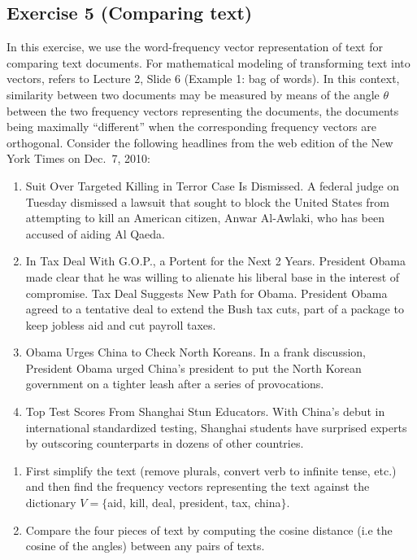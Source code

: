 \documentclass[11pt]{article}
\begin{document}
\newpage
\subsection*{Exercise 5 (Comparing text)}

In this exercise, we  use the word-fre\-quen\-cy vector representation of text
 for comparing  text documents. For mathematical modeling of transforming text into vectors, refers to Lecture 2, Slide 6 (Example 1: bag of words).
In this context, similarity between two documents may be measured by means of the angle $\theta$ between the two frequency vectors
representing the documents, the documents being maximally ``different'' when the corresponding frequency vectors are orthogonal.
Consider the following
headlines from the web edition of the New York Times on Dec.\ 7, 2010:

\begin{enumerate}[label=(\alph*)]
    \item Suit Over Targeted Killing in Terror Case Is Dismissed. A federal judge on Tuesday dismissed a lawsuit that sought to block the United States from attempting to kill an American citizen, Anwar Al-Awlaki, who has been accused of aiding Al Qaeda.

    \item In Tax Deal With G.O.P., a Portent for the Next 2 Years. President Obama made clear that he was willing to alienate his liberal base in the interest of compromise. Tax Deal Suggests New Path for Obama. President Obama agreed to a tentative deal to extend the Bush tax cuts, part of a package to keep jobless aid and cut payroll taxes.

    \item Obama Urges China to Check North Koreans. In a frank discussion, President Obama urged China's president to put the North Korean government on a tighter leash after a series of provocations.

    \item Top Test Scores From Shanghai Stun Educators. With China's debut in international standardized testing, Shanghai students have surprised experts by outscoring counterparts in dozens of other countries.
\end{enumerate}

\begin{enumerate}
    \item
    First simplify the text (remove plurals, convert verb to infinite tense, etc.) and then find the frequency vectors   representing the text against the dictionary $V=\{$aid, kill, deal, president, tax, china$\}$.

    \item Compare the four pieces of text by computing the cosine distance (i.e the cosine of the angles) between any pairs of texts.
\end{enumerate}
\end{document}
